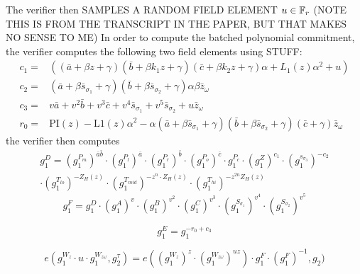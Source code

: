 The verifier then SAMPLES A RANDOM FIELD ELEMENT $u\in \mathbb{F}_r$ (NOTE THIS IS FROM THE TRANSCRIPT IN THE PAPER, BUT THAT MAKES NO SENSE TO ME)
In order to compute the batched polynomial commitment, the verifier computes the following two field elements using STUFF:
\begin{equation}
\begin{array}{rl}
c_1 = & \left((\bar{a}+\beta z+\gamma)(\bar{b}+\beta k_1 z+\gamma)(\bar{c}+\beta k_2 z+\gamma)\alpha+L_1(z)\alpha^2+u\right)\\
c_2 = & (\bar{a}+\beta \bar{s}_{\sigma_1}+\gamma)(\bar{b}+\beta \bar{s}_{\sigma_2}+\gamma)\alpha\beta\bar{z}_\omega\\
c_3 = & v\bar{a} + v^2\bar{b} + v^3\bar{c} + v^4\bar{s}_{\sigma_1} + v^5\bar{s}_{\sigma_2} + u\bar{z}_\omega\\
r_0 = & \text{PI}(z) - \text{L1}(z)\alpha^2 - \alpha(\bar{a} + \beta\bar{s}_{\sigma_1} + \gamma)(\bar{b} + \beta\bar{s}_{\sigma_2} + \gamma)(\bar{c} + \gamma)\bar{z}_\omega
\end{array}
\end{equation} 
the verifier then computes
\begin{multline}
g_1^D = \left(g_1^{P_m}\right)^{\bar{a}\bar{b}} \cdot \left(g_1^{P_l}\right)^{\bar{a}} \cdot \left(g_1^{P_r}\right)^{\bar{b}} \cdot \left(g_1^{P_o}\right)^{\bar{c}} \cdot g_1^{P_c} \cdot \left(g_1^Z\right)^{c_1} \cdot \left(g_1^{s_{\sigma_3}}\right)^{-c_2}\\ \cdot \left(g_1^{T_{lo}}\right)^{-Z_H(z)} \cdot \left(g_1^{T_{mid}}\right)^{-z^n\cdot Z_H(z)} \cdot \left(g_1^{T_{hi}}\right)^{-z^{2n}Z_H(z)}
\end{multline}
\begin{equation}
g_1^F = g_1^D \cdot \left(g_1^A\right)^{v}\cdot \left(g_1^B\right)^{v^2}\cdot \left(g_1^C\right)^{v^3}\cdot \left(g_1^{S_{\sigma_1}}\right)^{v^4}\cdot \left(g_1^{S_{\sigma_2}}\right)^{v^5}  
\end{equation}

\begin{equation}
g_1^E = g_1^{-r_0+c_3}
\end{equation}

\begin{equation}
e(g_1^{W_z} \cdot u \cdot g_1^{W_{z\omega}},g_2^{\tau}) = 
e(\left(g_1^{W_z}\right)^z \cdot \left(g_1^{W_{z\omega}}\right)^{uz})\cdot g_1^F \cdot \left(g_1^{F}\right)^{-1}, g_2)
\end{equation}